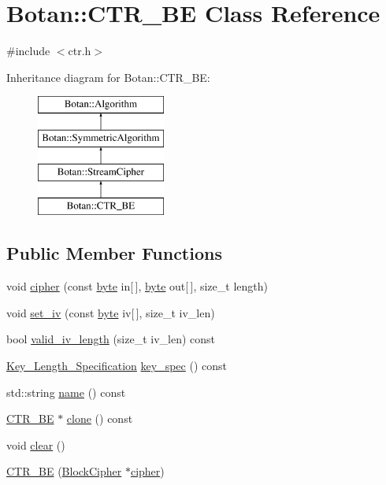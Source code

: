 \hypertarget{classBotan_1_1CTR__BE}{\section{Botan\-:\-:C\-T\-R\-\_\-\-B\-E Class Reference}
\label{classBotan_1_1CTR__BE}
}


{\ttfamily \#include $<$ctr.\-h$>$}

Inheritance diagram for Botan\-:\-:C\-T\-R\-\_\-\-B\-E\-:\begin{figure}[H]
\begin{center}
\leavevmode
\includegraphics[height=4.000000cm]{classBotan_1_1CTR__BE}
\end{center}
\end{figure}
\subsection*{Public Member Functions}
\begin{DoxyCompactItemize}
\item 
void \hyperlink{classBotan_1_1CTR__BE_a83936f82d0e761c373b80d6d43b18880}{cipher} (const \hyperlink{namespaceBotan_a7d793989d801281df48c6b19616b8b84}{byte} in\mbox{[}$\,$\mbox{]}, \hyperlink{namespaceBotan_a7d793989d801281df48c6b19616b8b84}{byte} out\mbox{[}$\,$\mbox{]}, size\-\_\-t length)
\item 
void \hyperlink{classBotan_1_1CTR__BE_a9fea731e55f3267789e85ecf733d0da9}{set\-\_\-iv} (const \hyperlink{namespaceBotan_a7d793989d801281df48c6b19616b8b84}{byte} iv\mbox{[}$\,$\mbox{]}, size\-\_\-t iv\-\_\-len)
\item 
bool \hyperlink{classBotan_1_1CTR__BE_aff10f4ae2f0d4054c78ab3d9dce7be31}{valid\-\_\-iv\-\_\-length} (size\-\_\-t iv\-\_\-len) const 
\item 
\hyperlink{classBotan_1_1Key__Length__Specification}{Key\-\_\-\-Length\-\_\-\-Specification} \hyperlink{classBotan_1_1CTR__BE_a5e69e58fdb80273a3e16fa1427a3057e}{key\-\_\-spec} () const 
\item 
std\-::string \hyperlink{classBotan_1_1CTR__BE_ac4df4e77f15f63b56fbe1990b00bfb32}{name} () const 
\item 
\hyperlink{classBotan_1_1CTR__BE}{C\-T\-R\-\_\-\-B\-E} $\ast$ \hyperlink{classBotan_1_1CTR__BE_ae360c204124f93dbfc3a51a0d18e0909}{clone} () const 
\item 
void \hyperlink{classBotan_1_1CTR__BE_acd7bc15cc2e1344c521c7a5543b84ebf}{clear} ()
\item 
\hyperlink{classBotan_1_1CTR__BE_add1e1aef0d8321baf68245ca286aff0c}{C\-T\-R\-\_\-\-B\-E} (\hyperlink{classBotan_1_1BlockCipher}{Block\-Cipher} $\ast$\hyperlink{classBotan_1_1CTR__BE_a83936f82d0e761c373b80d6d43b18880}{cipher})
\end{DoxyCompactItemize}


